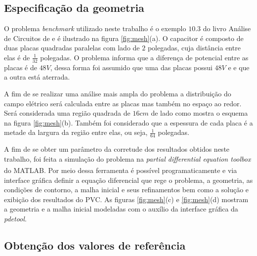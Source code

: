 \documentclass[
    12pt,               %
    openright,          %
    oneside,
    a4paper,            %
    english,            %
    french,             %
    spanish,            %
    brazil              %
    ]{abntex2}
\newcommand{\matlab}{MATLAB\textsuperscript{\textregistered}}
\begin{document}
\subsection{Especificação da geometria}
O problema \textit{benchmark} utilizado neste trabalho é o exemplo $10.3$ do livro Análise de Circuitos de  e é ilustrado na figura \ref{fig:mesh}{(a)}. O capacitor é composto de duas placas quadradas paralelas com lado de $2$ polegadas, cuja distância entre elas é de $\frac{1}{32}$ polegadas. O problema informa que a diferença de potencial entre as placas é de $48V$, dessa forma foi assumido que uma das placas possui $48V$ e e que a outra está aterrada.

A fim de se realizar uma análise mais ampla do problema a distribuição do campo elétrico será calculada entre as placas mas também no espaço ao redor. Será considerada uma região quadrada de $16cm$ de lado como mostra o esquema na figura \ref{fig:mesh}{(b)}. Também foi considerado que a espessura de cada placa é a metade da largura da região entre elas, ou seja, $\frac{1}{64}$ polegadas.


A fim de se obter um parâmetro da corretude dos resultados obtidos neste trabalho, foi feita a simulação do problema na \textit{partial differential equation toolbox} do \matlab. Por meio dessa ferramenta é possível programaticamente e via interface gráfica definir a equação diferencial que rege o problema, a geometria, as condições de contorno, a malha inicial e seus refinamentos bem como a solução e exibição dos resultados do PVC. As figuras \ref{fig:mesh}{(c)} e \ref{fig:mesh}{(d)} mostram a geometria e a malha inicial modeladas com o auxílio da interface gráfica da \textit{pdetool}.

\subsection{Obtenção dos valores de referência}
\end{document}
